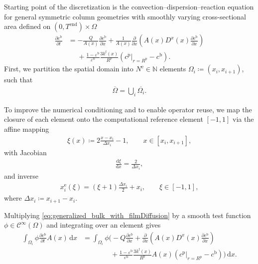 Starting point of the discretization is the convection--dispersion--reaction equation for general symmetric column geometries with smoothly varying cross-sectional area defined on $(0,T^\mathrm{end})\times\Omega$
\begin{align}
    \label{eq:generalized_bulk_with_filmDiffusion}
    \frac{\partial c^\mathrm{b}}{\partial t}
    &=
    -\frac{Q}{A(x)}
    \frac{\partial c^\mathrm{b}}{\partial x}
    +
    \frac{1}{A(x)}
    \frac{\partial}{\partial x}
    \left(
    A(x)D^x(x)
    \frac{\partial c^\mathrm{b}}{\partial x}
    \right)
    \nonumber\\
    &\phantom{={}}
    +
    \frac{1-\varepsilon^\mathrm{b}}{\varepsilon^\mathrm{b}}
    \frac{3k^\mathrm{f}(x)}{R^\mathrm{p}}
    \left(
    \left.c^\mathrm{p}\right|_{r=R^\mathrm{p}}
    -
    c^\mathrm{b}
    \right).
\end{align}
First, we partition the spatial domain into $N^\mathrm{e}\in\mathbb{N}$ elements $\Omega_i\coloneq(x_i,x_{i+1})$, such that
\begin{align}
    \overline{\Omega} = \bigcup_i \overline{\Omega_i}.
\end{align}

To improve the numerical conditioning and to enable operator reuse, we map the closure of each element onto the computational reference element $[-1,1]$ via the affine mapping
\begin{align}
    \label{eq:general_reference_mapping}
    \xi(x)
    \coloneq
    2\frac{x-x_i}{\Delta x_i}-1,
    \qquad
    x\in[x_i,x_{i+1}],
\end{align}
with Jacobian
\begin{align}
    \frac{\mathrm d\xi}{\mathrm dx}
    =
    \frac{2}{\Delta x_i},
\end{align}
and inverse
\begin{align}
    x_i^\mathrm{e}(\xi)
    =
    (\xi+1)\frac{\Delta x_i}{2}+x_i,
    \qquad
    \xi\in[-1,1],
\end{align}
where $\Delta x_i\coloneq x_{i+1}-x_i$.

Multiplying \cref{eq:generalized_bulk_with_filmDiffusion} by a smooth test function
$\phi\in\mathcal C^\infty(\Omega)$
and integrating over an element gives
\begin{align*}
    \int_{\Omega_i}
    \phi
    \frac{\partial c^\mathrm{b}}{\partial t}
    A(x)
    \,\mathrm dx
    &=
    \int_{\Omega_i}
    \phi
    \Bigg(
    -Q
    \frac{\partial c^\mathrm{b}}{\partial x}
    +
    \frac{\partial}{\partial x}
    \left(
    A(x)D^x(x)
    \frac{\partial c^\mathrm{b}}{\partial x}
    \right)
    \\
    &\qquad\qquad
    +
    \frac{1-\varepsilon^\mathrm b}{\varepsilon^\mathrm b}
    \frac{3k^\mathrm f(x)}{R^\mathrm p}
    A(x)
    \left(
    \left.c^\mathrm p\right|_{r=R^\mathrm p}
    -c^\mathrm{b}
    \right)
    \Bigg)
    \,\mathrm dx.
\end{align*}

